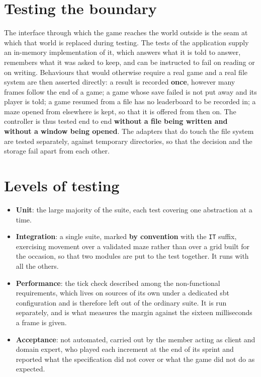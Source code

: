\section{Testing the boundary}

The interface through which the game reaches the world outside is the seam at which that world is replaced during
testing. The tests of the application supply an in-memory implementation of it, which answers what it is told to
answer, remembers what it was asked to keep, and can be instructed to fail on reading or on writing. Behaviours that
would otherwise require a real game and a real file system are then asserted directly: a result is recorded
\textbf{once}, however many frames follow the end of a game; a game whose save failed is not put away and its player is
told; a game resumed from a file has no leaderboard to be recorded in; a maze opened from elsewhere is kept, so that it
is offered from then on. The controller is thus tested end to end \textbf{without a file being written and without a
window being opened}. The adapters that do touch the file system are tested separately, against temporary directories,
so that the decision and the storage fail apart from each other.

\section{Levels of testing}

\begin{itemize}
  \item \textbf{Unit}: the large majority of the suite, each test covering one abstraction at a time.
  \item \textbf{Integration}: a single suite, marked \textbf{by convention} with the \texttt{IT} suffix, exercising
  movement over a validated maze rather than over a grid built for the occasion, so that two modules are put to the
  test together. It runs with all the others.
  \item \textbf{Performance}: the tick check described among the non-functional requirements, which lives on sources of
  its own under a dedicated sbt configuration and is therefore left out of the ordinary suite. It is run separately, and
  is what measures the margin against the sixteen milliseconds a frame is given.
  \item \textbf{Acceptance}: not automated, carried out by the member acting as client and domain expert, who played
  each increment at the end of its sprint and reported what the specification did not cover or what the game did not do
  as expected.
\end{itemize}


